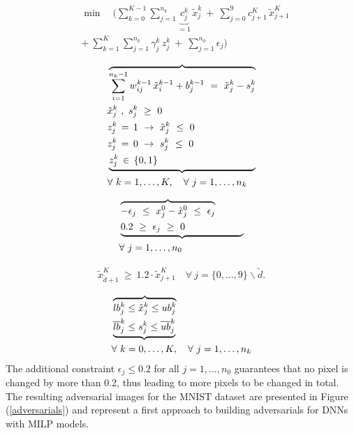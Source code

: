 \documentclass{article}
\begin{document}
\begin{align} 
&\min \quad \Bigg(  \sum_{k=0}^{K-1} \sum_{j=1}^{n_k} \underbrace{c_j^k}_{=1} \,\tilde{x}_j^k \ + \ \sum_{j=0}^{9} c_{j+1}^K \, \tilde{x}_{j+1}^K \\
&+ \ \sum_{k=1}^K \sum_{j=1}^{n_k} \gamma^k_j \, z^k_j \ + \ \sum_{j=1}^{n_0} \epsilon_j \Bigg)
\end{align}

\begin{align} 
&\overbrace{ 
\sum_{i=1}^{n_k -1} w_{ij}^{k-1}\,  \tilde{x}_i^{k-1} + b_j^{k-1} \ = \ \tilde{x}_j^k - s_j^k }  \notag \\
&\tilde{x}_j^k \ , \ s_j^k \ \geq \ 0 \notag \\
&z_j^k \, = \, 1  \ \to \ \tilde{x}_j^k \ \leq \ 0 \notag\\ 
&z_j^k \, = \, 0 \ \to \ s_j^k \ \leq \ 0  \notag\\
&\underbrace{ z_j^k \, \in \, \{0,1\} \notag \qquad \qquad \qquad \qquad \qquad } \\
&\forall \ k=1, \ldots, K, \quad  \forall \ j=1, \ldots, n_k
\end{align}

\begin{align}
&\overbrace{
-\epsilon_j \ \leq \ x_j^0 - \tilde{x}_j^0 \ \leq \ \epsilon_j } \notag \\
&\underbrace{0.2 \ \geq \ \epsilon_j \ \geq \ 0 \qquad \qquad \qquad } \notag \\
&\forall \ j=1, \ldots, n_0
\end{align}

\begin{align}
\tilde{x}^K_{\tilde{d}+1} \ \geq \ 1.2 \cdot \tilde{x}_{j+1}^K \quad \forall \ j=\{0,\ldots ,9 \} \backslash \tilde{d}.
\end{align}

\begin{align} 
&\overbrace{
lb_j^k \leq \tilde{x}_j^k \leq ub_j^k} \notag \\
&\underbrace{ \overline{lb}_j^k \leq s_j^k \leq \overline{ub}_j^k }   \notag \\
& \forall \ k =0, \ldots, K, \quad \forall \ j=1, \ldots, n_k
\end{align}
The additional constraint $\epsilon_j \leq 0.2$ for all $j=1,\ldots,n_0$ guarantees that no pixel is changed by more than 0.2, thus leading to more pixels to be changed in total.\\
The resulting adversarial images for the MNIST dataset are presented in Figure (\ref{adversarials}) and represent a first approach to building adversarials for DNNs with MILP models.
\end{document}
